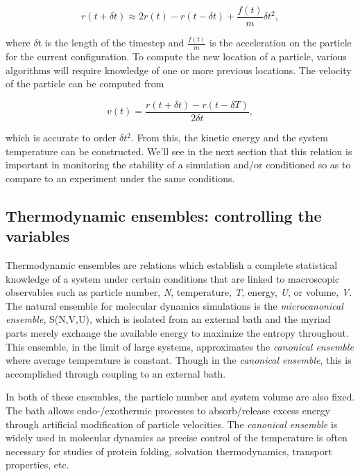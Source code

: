 \begin{theory}
  \begin{equation}
      r(t+\delta t) \approx 2r(t) - r(t-\delta t) + \frac{f(t)}{m}\delta t^2,
  \end{equation}
  
  \noindent where $\delta$t is the length of the timestep and $\frac{f(t)}{m}$ is the acceleration on the particle
  for the current configuration. To compute the new location of a particle, various algorithms will require knowledge
  of one or more previous locations. The velocity of the particle can be computed from
  
  \begin{equation}
      v(t) = \frac{r(t+\delta t) - r(t-\delta T)}{2\delta t},
  \end{equation}

  \noindent which is accurate to order $\delta t^{2}$. From this, the kinetic energy and the system temperature can 
  be constructed. We'll see in the next section that this relation is important in monitoring the stability of a 
  simulation and/or conditioned so as to compare to an experiment under the same conditions.

  \subsection{\label{ch2:sec3:level6}Thermodynamic ensembles: controlling the variables}
  Thermodynamic ensembles are relations which establish a complete statistical knowledge of a system under certain
  conditions that are linked to macroscopic observables such as particle number, \emph{N}, temperature, \emph{T},
  energy, \emph{U}, or volume, \emph{V}. The natural ensemble for molecular dynamics simulations is the 
  \emph{microcanonical ensemble}, S(N,V,U), which is isolated from an external bath and the myriad parts merely 
  exchange the available energy to maximize the entropy throughout. This ensemble, in the limit of large systems,
  approximates the \emph{canonical ensemble} where average temperature is constant. Though in the \emph{canonical ensemble}, 
  this is accomplished through coupling to an external bath. 
  
  In both of these ensembles, the particle number and system volume are also fixed. The bath allows endo-/exothermic 
  processes to absorb/release excess energy through artificial modification of particle velocities. The \emph{canonical 
  ensemble} is widely used in molecular dynamics as precise control of the temperature is often necessary for studies of 
  protein folding, solvation thermodynamics, transport properties, etc. 
  

\end{theory}
